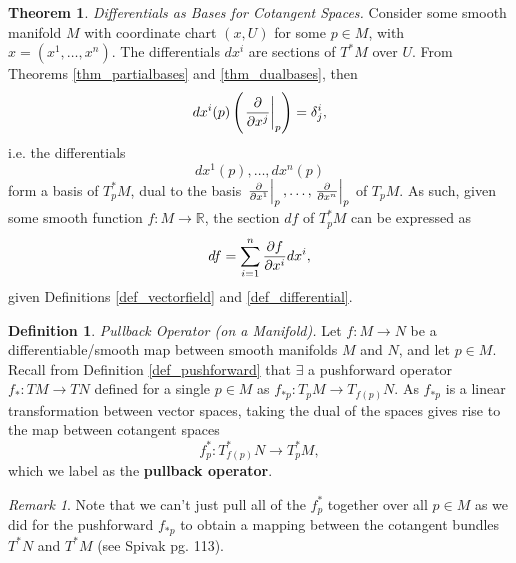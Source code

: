 \documentclass[10pt,landscape]{article}
\theoremstyle{definition}
\newtheorem{definition}{Definition}[section]
\theoremstyle{theorem}
\newtheorem{theorem}{Theorem}[section]
\theoremstyle{summary}
\theoremstyle{remark}
\newtheorem*{remark}{Remark}
\newcommand{\R}{\mathbb{R}}
\begin{document}
\begin{multicols*}{3}
\theoremstyle{theorem}
\begin{theorem}{\textit{Differentials as Bases for Cotangent Spaces.}}
    \label{thm_differentialsbasiscotangentspaces}
    Consider some smooth manifold $M$ with coordinate chart $(x, U)$ for some $p\in M$, with $x = (x^1,\ldots,x^n)$. The differentials $dx^i$ are sections of $T^*M$ over $U$.
    From Theorems \ref{thm_partialbases} and \ref{thm_dualbases}, then 
    \begin{equation}
        dx^i(p)\left(\displaystyle\left.\pdv{}{x^j}\right|_p\right) = \delta_j^i,
    \end{equation}
    i.e. the differentials
    \begin{equation}
        dx^1(p), \ldots, dx^n(p)
    \end{equation}
    form a basis of $T^*_pM$, dual to the basis $\left.\pdv{}{x^1}\right|_p,\ldots,\left.\pdv{}{x^n}\right|_p$ of $T_pM$. As such, given some smooth function $f:M\rightarrow \R$, the section $df$ of $T^*_pM$ can be expressed as
    \begin{equation}
        df = \sum\limits_{i=1}^n\pdv{f}{x^i}dx^i,
    \end{equation}
    given Definitions \ref{def_vectorfield} and \ref{def_differential}.
\end{theorem}

\theoremstyle{definition}
\begin{definition}{\textit{Pullback Operator (on a Manifold).}}
    Let $f:M\rightarrow N$ be a differentiable/smooth map between smooth manifolds $M$ and $N$, and let $p\in M$. Recall from Definition \ref{def_pushforward} that $\exists$ a pushforward operator $f_*:TM\rightarrow TN$ defined for a single $p\in M$ as $f_{*p} : T_pM\rightarrow T_{f(p)}N$. As $f_{*p}$ is a linear transformation between vector spaces, taking the dual of the spaces gives rise to the map between cotangent spaces
    \begin{equation}
        f_p^* : T_{f(p)}^* N\rightarrow T_p^*M,
    \end{equation}
    which we label as the \textbf{pullback operator}.
\end{definition}

\begin{remark}
    Note that we can't just pull all of the $f_p^*$ together over all $p\in M$ as we did for the pushforward $f_{*p}$ to obtain a mapping between the cotangent bundles $T^*N$ and $T^*M$ (see Spivak pg. 113).
\end{remark}


\end{multicols*}
\end{document}
